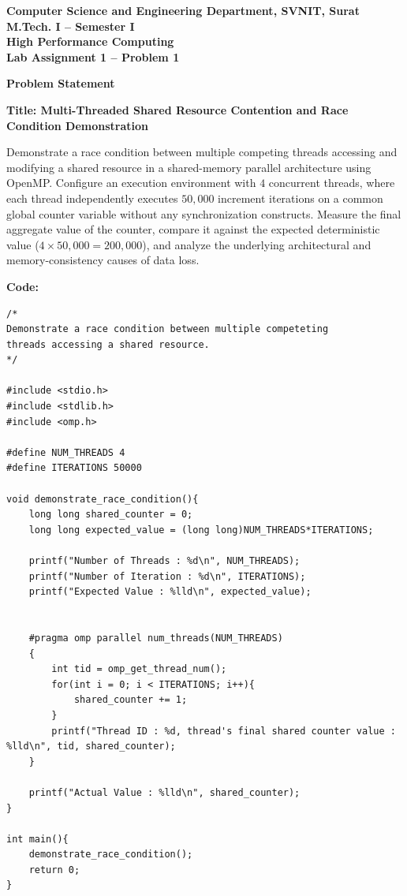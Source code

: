 \documentclass[12pt]{article}
\begin{document}

\begin{center}
\textbf{Computer Science and Engineering Department, SVNIT, Surat}\\
\textbf{M.Tech. I -- Semester I}\\
\textbf{High Performance Computing}\\
\textbf{Lab Assignment 1 -- Problem 1}
\end{center}

\vspace{0.4cm}

\textbf{Problem Statement}

\textbf{Title: Multi-Threaded Shared Resource Contention and Race Condition Demonstration}

Demonstrate a race condition between multiple competing threads accessing and modifying a shared resource in a shared-memory parallel architecture using OpenMP. Configure an execution environment with $4$ concurrent threads, where each thread independently executes $50,000$ increment iterations on a common global counter variable without any synchronization constructs. Measure the final aggregate value of the counter, compare it against the expected deterministic value ($4 \times 50,000 = 200,000$), and analyze the underlying architectural and memory-consistency causes of data loss.

\vspace{0.3cm}

\textbf{Code:}

\begin{lstlisting}
/*
Demonstrate a race condition between multiple competeting
threads accessing a shared resource.
*/

#include <stdio.h>
#include <stdlib.h>
#include <omp.h>

#define NUM_THREADS 4
#define ITERATIONS 50000

void demonstrate_race_condition(){
    long long shared_counter = 0;
    long long expected_value = (long long)NUM_THREADS*ITERATIONS;
    
    printf("Number of Threads : %d\n", NUM_THREADS);
    printf("Number of Iteration : %d\n", ITERATIONS);
    printf("Expected Value : %lld\n", expected_value);
    
    
    #pragma omp parallel num_threads(NUM_THREADS)
    {
        int tid = omp_get_thread_num();
        for(int i = 0; i < ITERATIONS; i++){
            shared_counter += 1;
        }
        printf("Thread ID : %d, thread's final shared counter value : %lld\n", tid, shared_counter);
    }

    printf("Actual Value : %lld\n", shared_counter);
}

int main(){
    demonstrate_race_condition();
    return 0;
}
\end{lstlisting}
\end{document}
